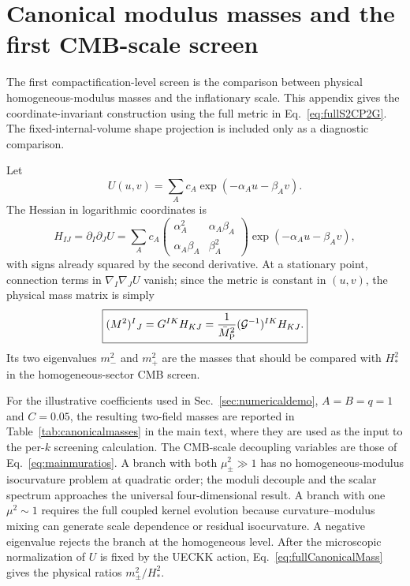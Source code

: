 \documentclass[aps,prd,twocolumn,superscriptaddress,nofootinbib,longbibliography,floatfix]{revtex4-2}
\newcommand{\Mpl}{\bar M_{\rm P}}
\begin{document}
\section{Canonical modulus masses and the first CMB-scale screen}
\label{app:canonicalmassscreen}
The first compactification-level screen is the comparison between physical homogeneous-modulus masses and the inflationary scale. This appendix gives the coordinate-invariant construction using the full metric in Eq.~\eqref{eq:fullS2CP2G}. The fixed-internal-volume shape projection is included only as a diagnostic comparison.

Let
\begin{equation}
U(u,v)=\sum_A c_A\exp(-\alpha_A u-\beta_A v).
\end{equation}
The Hessian in logarithmic coordinates is
\begin{equation}
H_{IJ}=\partial_I\partial_JU
=\sum_A c_A
\begin{pmatrix}
\alpha_A^2&\alpha_A\beta_A\\
\alpha_A\beta_A&\beta_A^2
\end{pmatrix}
\exp(-\alpha_Au-\beta_Av),
\label{eq:fullHessianExp}
\end{equation}
with signs already squared by the second derivative. At a stationary point, connection terms in $\nabla_I\nabla_JU$ vanish; since the metric is constant in $(u,v)$, the physical mass matrix is simply
\begin{equation}
\boxed{
(M^2)^I{}_{J}=G^{IK}H_{KJ}
=\frac{1}{\Mpl^2}(\mathcal G^{-1})^{IK}H_{KJ}.
}
\label{eq:fullCanonicalMass}
\end{equation}
Its two eigenvalues $m_-^2$ and $m_+^2$ are the masses that should be compared with $H_*^2$ in the homogeneous-sector CMB screen.

For the illustrative coefficients used in Sec.~\ref{sec:numericaldemo}, $A=B=q=1$ and $C=0.05$, the resulting two-field masses are reported in Table~\ref{tab:canonicalmasses} in the main text, where they are used as the input to the per-$k$ screening calculation. The CMB-scale decoupling variables are those of Eq.~\eqref{eq:mainmuratios}.
A branch with both $\mu_\pm^2\gg1$ has no homogeneous-modulus isocurvature problem at quadratic order; the moduli decouple and the scalar spectrum approaches the universal four-dimensional result. A branch with one $\mu^2\sim1$ requires the full coupled kernel evolution because curvature--modulus mixing can generate scale dependence or residual isocurvature. A negative eigenvalue rejects the branch at the homogeneous level. After the microscopic normalization of $U$ is fixed by the UECKK action, Eq.~\eqref{eq:fullCanonicalMass} gives the physical ratios $m_\pm^2/H_*^2$.
\end{document}

